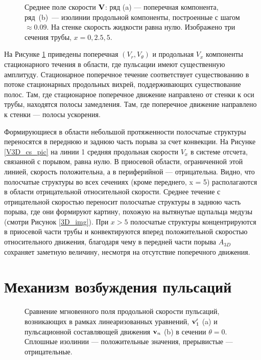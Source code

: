 \begin{figure}[h]
\caption{Среднее поле скорости $\mathbf{V}$: ряд (a) --- поперечная компонента, ряд~(b)~--- изолинии продольной компоненты, построенные с шагом $\approx 0.09$. На стенке скорость жидкости равна нулю. Изображено три сечения трубы, $x = 0, 2.5, 5$.}
\label{VEL_cs_pic}
\end{figure}

На Рисунке \ref{VEL_cs_pic} приведены поперечная $(V_r, V_\theta)$ и продольная $V_x$ компоненты стационарного течения в области, где пульсации имеют существенную амплитуду. Стационарное поперечное течение соответствует существованию в потоке стационарных продольных вихрей, поддерживающих существование полос. Там, где стационарное поперечное движение направлено от стенки к оси трубы, находятся полосы замедления. Там, где поперечное движение направлено к стенки --- полосы ускорения. 

Формирующиеся в области небольшой протяженности полосчатые структуры переносятся в переднюю и заднюю часть порыва за счет конвекции. На Рисунке \ref{V3D_cs_pic} на линии 1 средняя продольная скорости $V_x$ в системе отсчета, связанной с порывом, равна нулю. В приосевой области, ограниченной этой линией, скорость положительна, а в периферийной --- отрицательна. Видно, что полосчатые структуры во всех сечениях (кроме переднего, x = 5) располагаются в области отрицательной относительной скорости. Среднее течение с отрицательной скоростью переносит полосчатые структуры в заднюю часть порыва, где они формируют картину, похожую на вытянутые щупальца медузы (смотри Рисунок \ref{3D_img}). При $x > 5$ полосчатые структуры концентрируются в приосевой части трубы и конвектируются вперед положительной скоростью относительного движения, благодаря чему в передней части порыва $A_{3D}$ сохраняет заметную величину, несмотря на отсутствие поперечного движения.


\section{Механизм возбуждения пульсаций}

\begin{figure}
\caption{Сравнение мгновенного поля продольной скорости пульсаций, возникающих в рамках линеаризованных уравнений, $\mathbf{v}'_1$ (a) и пульсационной составляющей движения $\mathbf{v}_n$ (b) в сечении $\theta = 0$. Сплошные изолинии --- положительные значения, прерывистые --- отрицательные.}
% 
\label{lin_ls_cmp_pic}
\end{figure}

